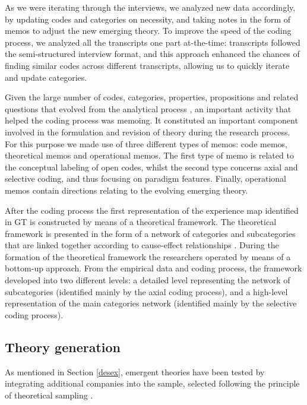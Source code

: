 \documentclass[10pt,journal,letterpaper,compsoc]{IEEEtran}
\begin{document}
As we were iterating through the interviews, we analyzed new data accordingly, 
by updating codes and categories on necessity, and taking notes in the form of 
memos to adjust the new emerging theory. To improve the speed of the coding 
process, we analyzed all the transcripts one part at-the-time: transcripts 
followed the semi-structured interview format, and this approach enhanced the 
chances of finding similar codes across different transcripts, allowing us to 
quickly iterate and update categories.

Given the large number of codes, categories, properties, propositions and 
related questions that evolved from the analytical process \cite{Corbin1990}, 
an important activity that helped the coding process was memoing. It constituted 
an important component involved in the formulation and revision of theory 
during the research process. For this purpose we made use of three different 
types of memos: code memos, theoretical memos and operational memos. The first 
type of memo is related to the conceptual labeling of open codes, whilst the 
second type concerns axial and selective coding, and thus focusing on paradigm 
features. Finally, operational memos contain directions relating to the evolving 
emerging theory.

After the coding process the first representation of the experience map 
identified in GT is constructed by means of a theoretical framework. The 
theoretical framework is presented in the form of a network of categories and 
subcategories that are linked together according to cause-effect relationships 
\cite{Corbin1990}. During the formation of the theoretical framework the 
researchers operated by means of a  bottom-up approach. From the empirical data 
and coding process, the framework developed into two different levels: a 
detailed level representing the network of subcategories (identified mainly by 
the axial coding process), and a high-level representation of the main 
categories network (identified mainly by the selective coding process).

\subsection{Theory generation}

As mentioned in Section \ref{desex}, emergent theories have been tested by 
integrating additional companies into the sample, selected following the 
principle of theoretical sampling \cite{Yin1994}. 
\end{document}
